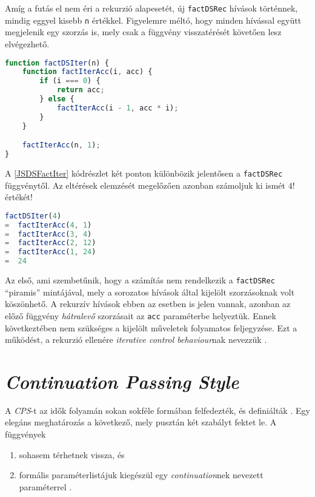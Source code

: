 Amíg a futás el nem éri a rekurzió alapesetét, új \texttt{factDSRec} hívások történnek, mindig eggyel kisebb \texttt{n} értékkel. Figyelemre méltó, hogy minden hívással együtt megjelenik egy szorzás is, mely csak a függvény visszatérését követően lesz elvégezhető.

\begin{lstlisting}[language=JavaScript, caption={\textit{Direct style} faktoriálist meghatározó függvény JavaScriptben}, captionpos=b, label=JSDSFactIter]
function factDSIter(n) {
    function factIterAcc(i, acc) {
        if (i === 0) {
            return acc;
        } else {
            factIterAcc(i - 1, acc * i);
        }
    }

    factIterAcc(n, 1);
}
\end{lstlisting}

A \ref{JSDSFactIter} kódrészlet két ponton különbözik jelentősen a \texttt{factDSRec} függvénytől. Az eltérések elemzését megelőzően azonban számoljuk ki ismét $4!$ értékét!

\begin{lstlisting}[language=JavaScript, caption={$4!$ kiszámítása \texttt{factDSIter} segítségével}, captionpos=b, numbers=none]
   factDSIter(4)
=  factIterAcc(4, 1)
=  factIterAcc(3, 4)
=  factIterAcc(2, 12)
=  factIterAcc(1, 24)
=  24
\end{lstlisting}

Az első, ami szembetűnik, hogy a számítás nem rendelkezik a \texttt{factDSRec} ``piramis'' mintájával, mely a sorozatos hívások által kijelölt szorzásoknak volt köszönhető. A rekurzív hívások ebben az esetben is jelen vannak, azonban az előző függvény \textit{hátralevő} szorzásait az \texttt{acc} paraméterbe helyeztük. Ennek következtében nem szükséges a kijelölt műveletek folyamatos feljegyzése. Ezt a működést, a rekurzió ellenére \textit{iterative control behaviour}nak nevezzük .

\section{\textit{Continuation Passing Style}}

A \textit{CPS}-t az idők folyamán sokan sokféle formában felfedezték, és definiálták \cite{Reynolds1993}. Egy elegáns meghatározás a következő, mely pusztán két szabályt fektet le. A függvények

\begin{enumerate}
    \item sohasem térhetnek vissza, és
    \item formális paraméterlistájuk kiegészül egy \textit{continuation}nek nevezett paraméterrel \cite{MightCPS}.
\end{enumerate}

